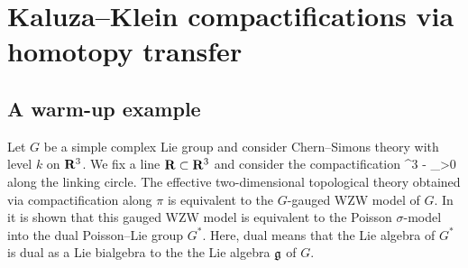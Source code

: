 \documentclass[../main.tex]{subfiles}
\begin{document}
 

\section{Kaluza--Klein compactifications via homotopy transfer}

\subsection{A warm-up example}

Let $G$ be a simple complex Lie group and consider Chern--Simons theory with level $k$ on $\mathbf{R}^3$.
We fix a line $\mathbf{R} \subset \mathbf{R}^3$ and consider the compactification
\beqn
\pi \colon \R^3 - \R \to \R \times \R_{>0}
\eeqn
along the linking circle.
The effective two-dimensional topological theory obtained via compactification along $\pi$ is equivalent to the $G$-gauged WZW model of $G$.
In \cite{FalcetoGawedzki} it is shown that this gauged WZW model is equivalent to the Poisson $\sigma$-model into the dual Poisson--Lie group $G^*$.
Here, dual means that the Lie algebra of $G^*$ is dual as a Lie bialgebra to the the Lie algebra $\mathfrak{g}$ of $G$.
\end{document}
